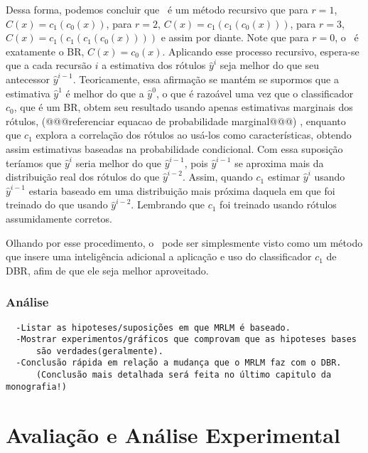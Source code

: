  Dessa forma, podemos concluir que \MRLM~é um método recursivo que
 para $r=1$, $C(x)=c_1(c_0(x))$,
 para $r=2$, $C(x)=c_1(c_1(c_0(x)))$,
 para $r=3$, $C(x)=c_1(c_1(c_1(c_0(x))))$ e assim por diante.
 Note que para $r=0$, o \MRLMa~é exatamente o BR, $C(x)=c_0(x)$.
 Aplicando esse processo recursivo, espera-se que a cada recursão $i$ a estimativa dos rótulos $\hat{y}^i$ seja melhor do que
 seu antecessor $\hat{y}^{i-1}$. Teoricamente, essa afirmação se mantém se supormos que a estimativa $\hat{y}^1$ é melhor do que a $\hat{y}^0$, 
 o que é razoável uma vez que o classificador $c_0$, que é um BR, obtem seu resultado usando apenas estimativas marginais dos rótulos,
 (@@@referenciar equacao de probabilidade marginal@@@)%
 , enquanto que $c_1$ explora a correlação dos rótulos ao usá-los como características, obtendo assim 
 estimativas baseadas na probabilidade condicional.
 Com essa suposição teríamos que $\hat{y}^i$ seria melhor do que $\hat{y}^{i-1}$, pois $\hat{y}^{i-1}$ se aproxima
 mais da distribuição real dos rótulos do que $\hat{y}^{i-2}$. Assim, quando $c_1$ estimar $\hat{y}^i$ usando $\hat{y}^{i-1}$ estaria baseado em 
 uma distribuição mais próxima daquela em que foi treinado do que usando $\hat{y}^{i-2}$.
 Lembrando que $c_1$ foi treinado usando rótulos assumidamente corretos.
 
 Olhando por esse procedimento, o \MRLMa~pode ser simplesmente visto como um método que insere uma inteligência
 adicional a aplicação e uso do classificador $c_1$ de DBR, afim de que ele seja melhor aproveitado.
 
 
 
 \subsection{Análise}
 \begin{verbatim}
  -Listar as hipoteses/suposições em que MRLM é baseado.
  -Mostrar experimentos/gráficos que comprovam que as hipoteses bases
      são verdades(geralmente).
  -Conclusão rápida em relação a mudança que o MRLM faz com o DBR.
      (Conclusão mais detalhada será feita no último capitulo da monografia!)
 \end{verbatim}



\chapter{Avaliação e Análise Experimental}
